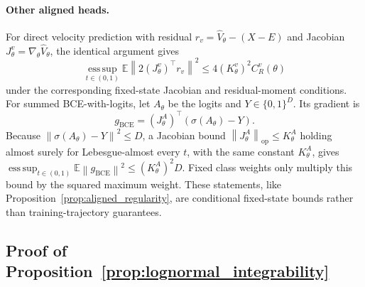 \documentclass{article}
\theoremstyle{plain}
\theoremstyle{definition}
\theoremstyle{remark}
\newcommand{\Ex}{\mathbb{E}}
\newcommand{\norm}[1]{\left\lVert #1\right\rVert}
\begin{document}
\paragraph{Other aligned heads.}
For direct velocity prediction with residual $r_v=\hat V_\theta-(X-E)$ and Jacobian $J_\theta^v=\nabla_\theta\hat V_\theta$, the identical argument gives
\begin{equation}
\operatorname*{ess\,sup}_{t\in(0,1)}\Ex\norm{2(J_\theta^v)^\top r_v}^2
\le4(K_\theta^v)^2C_R^v(\theta)
\end{equation}
under the corresponding fixed-state Jacobian and residual-moment conditions. For summed BCE-with-logits, let $A_\theta$ be the logits and $Y\in\{0,1\}^D$. Its gradient is
\begin{equation}
g_{\mathrm{BCE}}=(J_\theta^A)^\top(\sigma(A_\theta)-Y).
\end{equation}
Because $\norm{\sigma(A_\theta)-Y}^2\le D$, a Jacobian bound $\norm{J_\theta^A}_{\mathrm{op}}\le K_\theta^A$ holding almost surely for Lebesgue-almost every $t$, with the same constant $K_\theta^A$, gives $\operatorname*{ess\,sup}_{t\in(0,1)}\Ex\norm{g_{\mathrm{BCE}}}^2\le(K_\theta^A)^2D$. Fixed class weights only multiply this bound by the squared maximum weight. These statements, like Proposition~\ref{prop:aligned_regularity}, are conditional fixed-state bounds rather than training-trajectory guarantees.

\subsection{Proof of Proposition~\ref{prop:lognormal_integrability}}
\label{app:lognormal}
\end{document}
